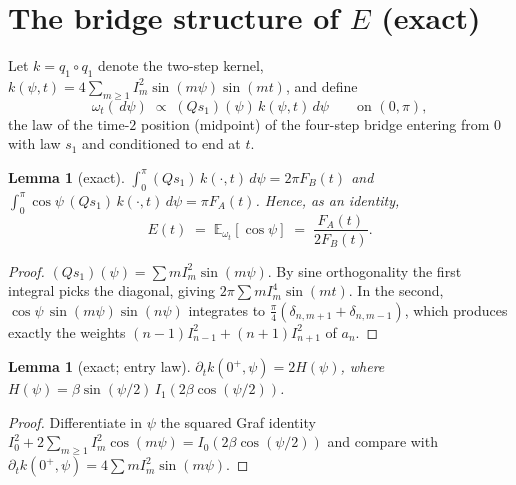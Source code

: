 \documentclass[11pt]{article}
\newtheorem{lemma}[theorem]{Lemma}
\theoremstyle{remark}
\newcommand{\FA}{F_{\!A}}
\newcommand{\FB}{F_{\!B}}
\newcommand{\dd}{\,d}
\begin{document}
\section{The bridge structure of $E$ (exact)}\label{sec:bridge}

Let $k=q_1\!\circ\!q_1$ denote the two-step kernel,
$k(\psi,t)=4\sum_{m\ge1}I_m^2\sin(m\psi)\sin(mt)$, and define
\begin{equation}\label{eq:omega}
\omega_t(\dd\psi)\;\propto\;(Qs_1)(\psi)\,k(\psi,t)\dd\psi
\qquad\text{on }(0,\pi),
\end{equation}
the law of the time-$2$ position (midpoint) of the four-step bridge
entering from $0$ with law $s_1$ and conditioned to end at $t$.

\begin{lemma}[exact]\label{lem:bridge}
$\displaystyle \int_0^\pi (Qs_1)\,k(\cdot,t)\dd\psi=2\pi\FB(t)$ and
$\displaystyle \int_0^\pi \cos\psi\,(Qs_1)\,k(\cdot,t)\dd\psi=\pi\FA(t)$.
Hence, as an identity,
\[
E(t)\;=\;\mathbb{E}_{\omega_t}[\cos\psi]\;=\;\frac{\FA(t)}{2\FB(t)} .
\]
\end{lemma}

\begin{proof}
$(Qs_1)(\psi)=\sum m I_m^2\sin(m\psi)$. By sine orthogonality the first
integral picks the diagonal, giving $2\pi\sum mI_m^4\sin(mt)$. In the
second, $\cos\psi\,\sin(m\psi)\sin(n\psi)$ integrates to
$\frac{\pi}{4}(\delta_{n,m+1}+\delta_{n,m-1})$, which produces exactly
the weights $(n-1)I_{n-1}^2+(n+1)I_{n+1}^2$ of $a_n$.
\end{proof}

\begin{lemma}[exact; entry law]\label{lem:entry}
$\partial_t k(0^+,\psi)=2H(\psi)$, where
$H(\psi)=\beta\sin(\psi/2)\,I_1(2\beta\cos(\psi/2))$.
\end{lemma}

\begin{proof}
Differentiate in $\psi$ the squared Graf identity
$I_0^2+2\sum_{m\ge1}I_m^2\cos(m\psi)=I_0(2\beta\cos(\psi/2))$
\cite[\S10.23(ii)]{DLMF} and compare with
$\partial_tk(0^+,\psi)=4\sum mI_m^2\sin(m\psi)$.
\end{proof}
\end{document}
